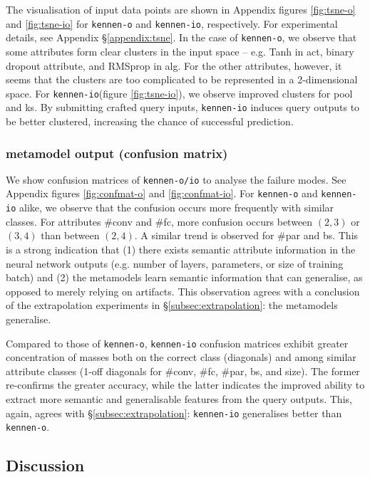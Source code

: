 \documentclass{article} %
\newcommand{\OR}{\texttt{kennen-o}\xspace}
\newcommand{\ORIC}{\texttt{kennen-io}\xspace}
\begin{document}
The visualisation of input data points are shown in Appendix figures \ref{fig:tsne-o} and \ref{fig:tsne-io} for \OR and \ORIC, respectively. For experimental details, see Appendix \S\ref{appendix:tsne}. In the case of \OR, we observe that some attributes form clear clusters in the input space -- e.g. Tanh in act, binary dropout attribute, and RMSprop in alg. For the other attributes, however, it seems that the clusters are too complicated to be represented in a 2-dimensional space. For \ORIC (figure \ref{fig:tsne-io}), we observe improved clusters for pool and ks. By submitting crafted query inputs, \ORIC induces query outputs to be better clustered, increasing the chance of successful prediction.

\subsubsection*{metamodel output (confusion matrix)}

We show confusion matrices of \texttt{kennen-o/io} to analyse the failure modes. See Appendix figures \ref{fig:confmat-o} and \ref{fig:confmat-io}. For \OR and \ORIC alike, we observe that the confusion occurs more frequently with similar classes. For attributes \#\ignorespaces conv and \#\ignorespaces fc, more confusion occurs between $(2,3)$ or $(3,4)$ than between $(2,4)$. A similar trend is observed for \#\ignorespaces par and bs. This is a strong indication that (1) there exists semantic attribute information in the neural network outputs (e.g. number of layers, parameters, or size of training batch) and (2) the metamodels learn semantic information that can generalise, as opposed to merely relying on artifacts. This observation agrees with a conclusion of the extrapolation experiments in \S\ref{subsec:extrapolation}: the metamodels generalise.

Compared to those of \OR, \ORIC confusion matrices exhibit greater concentration of masses both on the correct class (diagonals) and among similar attribute classes (1-off diagonals for \#\ignorespaces conv, \#\ignorespaces fc, \#\ignorespaces par, bs, and size). The former re-confirms the greater accuracy, while the latter indicates the improved ability to extract more semantic and generalisable features from the query outputs. This, again, agrees with \S\ref{subsec:extrapolation}: \ORIC generalises better than \OR.

\subsection{Discussion}
\end{document}
